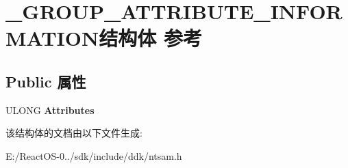 \hypertarget{struct___g_r_o_u_p___a_t_t_r_i_b_u_t_e___i_n_f_o_r_m_a_t_i_o_n}{}\section{\+\_\+\+G\+R\+O\+U\+P\+\_\+\+A\+T\+T\+R\+I\+B\+U\+T\+E\+\_\+\+I\+N\+F\+O\+R\+M\+A\+T\+I\+O\+N结构体 参考}
\label{struct___g_r_o_u_p___a_t_t_r_i_b_u_t_e___i_n_f_o_r_m_a_t_i_o_n}
\subsection*{Public 属性}
\begin{DoxyCompactItemize}
\item 
\mbox{\label{struct___g_r_o_u_p___a_t_t_r_i_b_u_t_e___i_n_f_o_r_m_a_t_i_o_n_a18335c63637f47ce481d9a0d9905b73b}} 
U\+L\+O\+NG {\bfseries Attributes}
\end{DoxyCompactItemize}


该结构体的文档由以下文件生成\+:\begin{DoxyCompactItemize}
\item 
E\+:/\+React\+O\+S-\/0../sdk/include/ddk/ntsam.\+h\end{DoxyCompactItemize}
